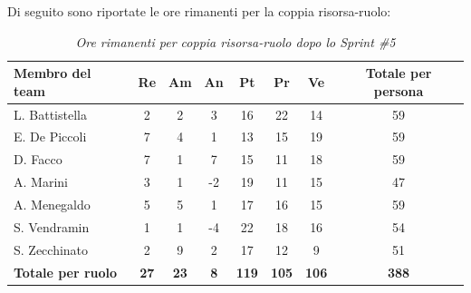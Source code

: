 ﻿\documentclass[a4paper, 10pt, colorlinks=true, linkcolor=black, urlcolor=blue, citecolor=blue, hidelinks]{article}
\renewcommand{\arraystretch}{1.2}
\begin{document}
Di seguito sono riportate le ore rimanenti per la coppia risorsa-ruolo:

\begin{table}[H]
    \centering
    \renewcommand{\arraystretch}{1.4}
    \begin{tabular}{|l|c|c|c|c|c|c|c|}
        \hline
        \rowcolor{bluBitless!15}
        \textbf{Membro del team} & \textbf{Re} & \textbf{Am} & \textbf{An} & \textbf{Pt} & \textbf{Pr} & \textbf{Ve} & \textbf{Totale per persona} \\
        \hline
        L. Battistella & 2 & 2 & 3 & 16 & 22 & 14 & 59 \\ \hline
        E. De Piccoli & 7 & 4 & 1 & 13 & 15 & 19 & 59 \\ \hline
        D. Facco & 7 & 1 & 7 & 15 & 11 & 18 & 59 \\ \hline
        A. Marini & 3 & 1 & -2 & 19 & 11 & 15 & 47 \\ \hline
        A. Menegaldo & 5 & 5 & 1 & 17 & 16 & 15 & 59 \\ \hline
        S. Vendramin & 1 & 1 & -4 & 22 & 18 & 16 & 54 \\ \hline
        S. Zecchinato & 2 & 9 & 2 & 17 & 12 & 9 & 51 \\ \hline
        \rowcolor{bluBitless!8}
        \textbf{Totale per ruolo} & \textbf{27} & \textbf{23} & \textbf{8} & \textbf{119} & \textbf{105} & \textbf{106} & \textbf{388} \\
        \hline
    \end{tabular}
    \caption{\textit{Ore rimanenti per coppia risorsa-ruolo dopo lo Sprint \#5}}
\end{table}
\end{document}
